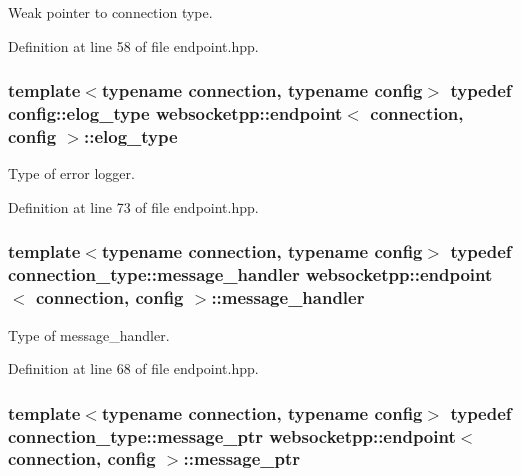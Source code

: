 Weak pointer to connection type. 



Definition at line 58 of file endpoint.\+hpp.

\hypertarget{classwebsocketpp_1_1endpoint_a4ab98f4fed5b5b2740105eff732c7b1e}{}
\subsubsection[{elog\+\_\+type}]{\setlength{\rightskip}{0pt plus 5cm}template$<$typename connection, typename config$>$ typedef config\+::elog\+\_\+type {\bf websocketpp\+::endpoint}$<$ {\bf connection}, config $>$\+::{\bf elog\+\_\+type}}\label{classwebsocketpp_1_1endpoint_a4ab98f4fed5b5b2740105eff732c7b1e}


Type of error logger. 



Definition at line 73 of file endpoint.\+hpp.

\hypertarget{classwebsocketpp_1_1endpoint_afa2109f793a8d8d90599ea339bbcd8e5}{}
\subsubsection[{message\+\_\+handler}]{\setlength{\rightskip}{0pt plus 5cm}template$<$typename connection, typename config$>$ typedef {\bf connection\+\_\+type\+::message\+\_\+handler} {\bf websocketpp\+::endpoint}$<$ {\bf connection}, config $>$\+::{\bf message\+\_\+handler}}\label{classwebsocketpp_1_1endpoint_afa2109f793a8d8d90599ea339bbcd8e5}


Type of message\+\_\+handler. 



Definition at line 68 of file endpoint.\+hpp.

\hypertarget{classwebsocketpp_1_1endpoint_a585ecbbfd9689d4e4229e4c8378bd672}{}
\subsubsection[{message\+\_\+ptr}]{\setlength{\rightskip}{0pt plus 5cm}template$<$typename connection, typename config$>$ typedef {\bf connection\+\_\+type\+::message\+\_\+ptr} {\bf websocketpp\+::endpoint}$<$ {\bf connection}, config $>$\+::{\bf message\+\_\+ptr}}\label{classwebsocketpp_1_1endpoint_a585ecbbfd9689d4e4229e4c8378bd672}


